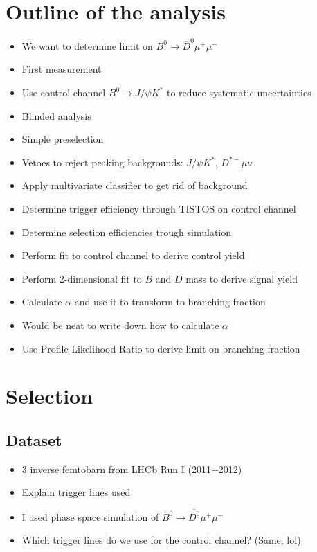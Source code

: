 
\chapter{Outline of the analysis} %

\begin{itemize}
  \item We want to determine limit on $B^0\to \overline{D}^0μ^+μ^-$
  \item First measurement
  \item Use control channel $B^0\to J/ψ K^*$ to reduce systematic uncertainties
  \item Blinded analysis
  \item Simple preselection
  \item Vetoes to reject peaking backgrounds: $J/ψ K^*$, $D^{*-}μν$
  \item Apply multivariate classifier to get rid of background
  \item Determine trigger efficiency through TISTOS on control channel
  \item Determine selection efficiencies trough simulation
  \item Perform fit to control channel to derive control yield
  \item Perform 2-dimensional fit to $B$ and $D$ mass to derive signal yield
  \item Calculate $α$ and use it to transform to branching fraction
  \item Would be neat to write down how to calculate $α$
  \item Use Profile Likelihood Ratio to derive limit on branching fraction
\end{itemize}

\chapter{Selection} %

\section{Dataset}

\begin{itemize}
  \item 3 inverse femtobarn from LHCb Run I (2011+2012)
  \item Explain trigger lines used
  \item I used phase space simulation of $B^0\to\overline{D^0}μ^+μ^-$
  \item Which trigger lines do we use for the control channel? (Same, lol)
\end{itemize}

